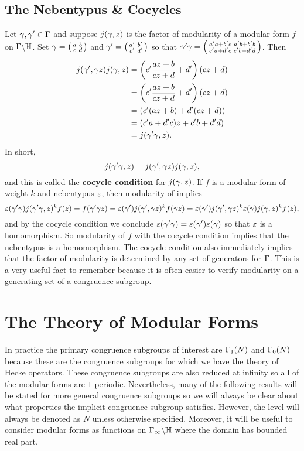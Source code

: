     \subsection*{The Nebentypus \& Cocycles}
      Let $\gamma,\gamma' \in \Gamma$ and suppose $j(\gamma,z)$ is the factor of modularity of a modular form $f$ on $\Gamma\backslash\mathbb{H}$. Set $\gamma = \begin{psmallmatrix} a & b \\ c & d \end{psmallmatrix}$ and $\gamma' = \begin{psmallmatrix} a' & b' \\ c' & d' \end{psmallmatrix}$ so that $\gamma'\gamma = \begin{psmallmatrix} a'a+b'c & a'b+b'b \\ c'a+d'c & c'b+d'd \end{psmallmatrix}$. Then
      \begin{align*}
        j(\gamma',\gamma z)j(\gamma,z) &= \left(c'\frac{az+b}{cz+d}+d'\right)(cz+d) \\
        &= \left(c'\frac{az+b}{cz+d}+d'\right)(cz+d) \\
        &= (c'(az+b)+d'(cz+d)) \\
        &= (c'a+d'c)z+c'b+d'd) \\
        &= j(\gamma'\gamma,z).
      \end{align*}
      In short,
      \[
        j(\gamma'\gamma,z) =  j(\gamma',\gamma z)j(\gamma,z),
      \]
      and this is called the \textbf{cocycle condition} for $j(\gamma,z)$. If $f$ is a modular form of weight $k$ and nebentypus $\varepsilon$, then modularity of implies
      \[
        \varepsilon(\gamma'\gamma)j(\gamma'\gamma,z)^{k}f(z) = f(\gamma'\gamma z) = \varepsilon(\gamma')j(\gamma',\gamma z)^{k}f(\gamma z) = \varepsilon(\gamma')j(\gamma',\gamma z)^{k}\varepsilon(\gamma)j(\gamma,z)^{k}f(z),
      \]
      and by the cocycle condition we conclude $\varepsilon(\gamma'\gamma) = \varepsilon(\gamma')\varepsilon(\gamma)$ so that $\varepsilon$ is a homomorphism. So modularity of $f$ with the cocycle condition implies that the nebentypus is a homomorphism. The cocycle condition also immediately implies that the factor of modularity is determined by any set of generators for $\Gamma$. This is a very useful fact to remember because it is often easier to verify modularity on a generating set of a congruence subgroup.
  \section{The Theory of Modular Forms}\label{sec:The_Theory_of_Modular_Forms}
    In practice the primary congruence subgroups of interest are $\Gamma_{1}(N)$ and $\Gamma_{0}(N)$ because these are the congruence subgroups for which we have the theory of Hecke operators. These congruence subgroups are also reduced at infinity so all of the modular forms are $1$-periodic. Nevertheless, many of the following results will be stated for more general congruence subgroups so we will always be clear about what properties the implicit congruence subgroup satisfies. However, the level will always be denoted as $N$ unless otherwise specified. Moreover, it will be useful to consider modular forms as functions on $\Gamma_{\infty}\backslash\mathbb{H}$ where the domain has bounded real part.
